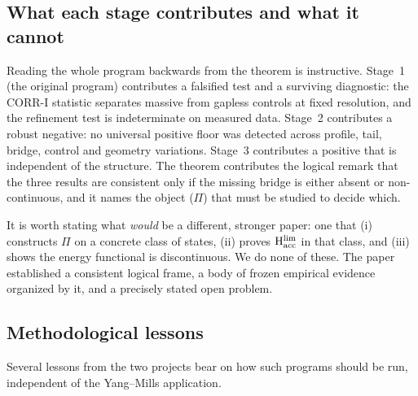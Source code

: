 \documentclass[11pt,a4paper]{article}
\theoremstyle{definition}
\theoremstyle{remark}
\newcommand{\Hacc}{\mathrm{H}_{\mathrm{acc}}}
\begin{document}
\subsection{What each stage contributes and what it cannot}\label{ssec:contrib}
Reading the whole program backwards from the theorem is instructive. Stage~1 (the original program) contributes a falsified test and a surviving diagnostic: the CORR-I statistic separates massive from gapless controls at fixed resolution, and the refinement test is indeterminate on measured data. Stage~2 contributes a robust negative: no universal positive floor was detected across profile, tail, bridge, control and geometry variations. Stage~3 contributes a positive that is independent of the structure. The theorem contributes the logical remark that the three results are consistent only if the missing bridge is either absent or non-continuous, and it names the object ($\Pi$) that must be studied to decide which.

It is worth stating what \emph{would} be a different, stronger paper: one that (i) constructs $\Pi$ on a concrete class of states, (ii) proves $\Hacc^{\rm lim}$ in that class, and (iii) shows the energy functional is discontinuous. We do none of these. The paper established a consistent logical frame, a body of frozen empirical evidence organized by it, and a precisely stated open problem.

\subsection{Methodological lessons}\label{ssec:lessons}
Several lessons from the two projects bear on how such programs should be run, independent of the Yang--Mills application.
\end{document}
